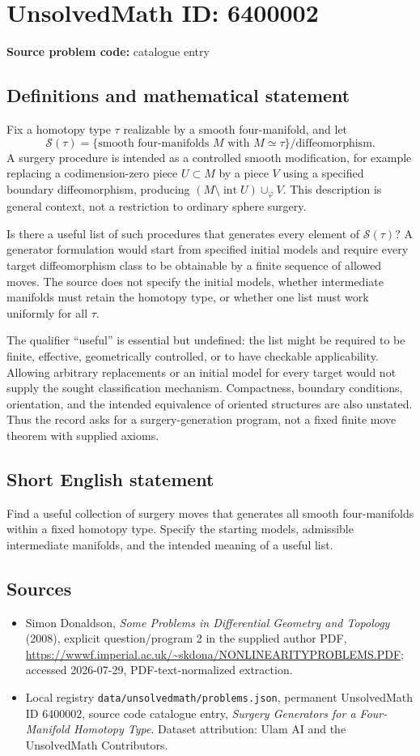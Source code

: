 \documentclass[11pt]{article}
\begin{document}
\section*{UnsolvedMath ID: 6400002}
\textbf{Source problem code:} catalogue entry
\subsection{Definitions and mathematical statement}
Fix a homotopy type $\tau$ realizable by a smooth four-manifold, and let
\[
\mathcal S(\tau)=\{\text{smooth four-manifolds }M\text{ with }M\simeq\tau\}/\text{diffeomorphism}.
\]
A surgery procedure is intended as a controlled smooth modification, for example replacing a codimension-zero piece $U\subset M$ by a piece $V$ using a specified boundary diffeomorphism, producing $(M\setminus\operatorname{int}U)\cup_\varphi V$. This description is general context, not a restriction to ordinary sphere surgery.

Is there a useful list of such procedures that generates every element of $\mathcal S(\tau)$? A generator formulation would start from specified initial models and require every target diffeomorphism class to be obtainable by a finite sequence of allowed moves. The source does not specify the initial models, whether intermediate manifolds must retain the homotopy type, or whether one list must work uniformly for all $\tau$.

The qualifier ``useful'' is essential but undefined: the list might be required to be finite, effective, geometrically controlled, or to have checkable applicability. Allowing arbitrary replacements or an initial model for every target would not supply the sought classification mechanism. Compactness, boundary conditions, orientation, and the intended equivalence of oriented structures are also unstated. Thus the record asks for a surgery-generation program, not a fixed finite move theorem with supplied axioms.
\subsection{Short English statement}
Find a useful collection of surgery moves that generates all smooth four-manifolds within a fixed homotopy type. Specify the starting models, admissible intermediate manifolds, and the intended meaning of a useful list.
\subsection{Sources}
\begin{itemize}
\item Simon Donaldson, \emph{Some Problems in Differential Geometry and Topology} (2008), explicit question/program 2 in the supplied author PDF, \url{https://wwwf.imperial.ac.uk/~skdona/NONLINEARITYPROBLEMS.PDF}; accessed 2026-07-29, PDF-text-normalized extraction.
\item Local registry \texttt{data/unsolvedmath/problems.json}, permanent UnsolvedMath ID $6400002$, source code catalogue entry, \emph{Surgery Generators for a Four-Manifold Homotopy Type}. Dataset attribution: Ulam AI and the UnsolvedMath Contributors.
\end{itemize}
\end{document}
